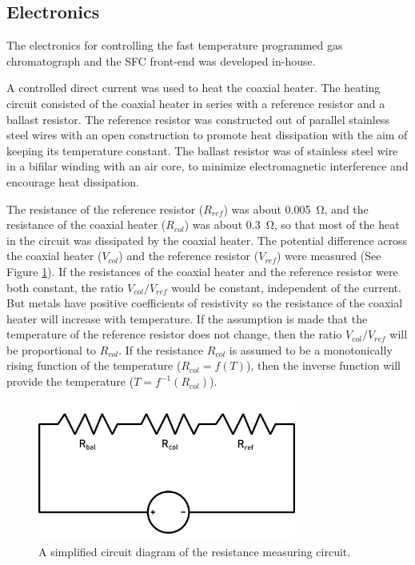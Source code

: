 \documentclass[aip,rsi,preprint,graphicx]{revtex4-1} %
\begin{document}
\subsection{Electronics}

The electronics for controlling the fast temperature programmed gas
chromatograph and the SFC front-end was developed in-house.

A controlled direct current was used to heat the coaxial heater. The heating
circuit consisted of the coaxial heater in series with a reference resistor and
a ballast resistor. The reference resistor was constructed out of parallel
stainless steel wires with an open construction to promote heat dissipation with
the aim of keeping its temperature constant. The ballast resistor was of stainless
steel wire in a bifilar winding with an air core, to minimize electromagnetic
interference and encourage heat dissipation.

The resistance of the reference resistor ($R_{ref}$) was about \SI{0.005}{\ohm},
and the resistance of the coaxial heater ($R_{col}$) was about  \SI{0.3}{\ohm}, so
that most of the heat in the circuit was dissipated by the coaxial heater.
The potential difference across the coaxial heater ($V_{col}$) and the reference
resistor ($V_{ref}$) were measured (See Figure \ref{Circuit}). If the
resistances of the coaxial heater and the reference resistor were both constant,
the ratio $V_{col}/V_{ref}$ would be constant, independent of the current.
But metals have positive coefficients of resistivity so the resistance of the
coaxial heater will increase with temperature. If the assumption is made that
the temperature of the reference resistor does not change, then the ratio
$V_{col}/V_{ref}$ will be proportional to $R_{col}$. If the resistance $R_{col}$ is
assumed to be a monotonically rising function of the temperature ($R_{col} = f(T)$),
then the inverse function will provide the temperature ($T = f^{-1}(R_{col})$).


\begin{figure}
\includegraphics[width=8.5cm]{./Figures/ResistanceMeasurement.pdf}%
\caption{\label{Circuit}A simplified circuit diagram of the resistance measuring circuit.}%
\end{figure}
\end{document}
